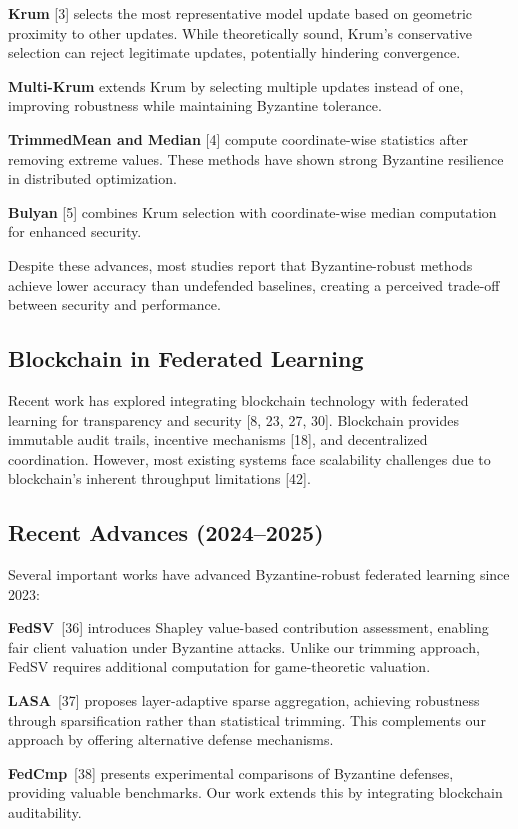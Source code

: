 \documentclass[12pt,a4paper,onecolumn]{article}
\begin{document}
\textbf{Krum} [3] selects the most representative model update based on geometric proximity to other updates. While theoretically sound, Krum's conservative selection can reject legitimate updates, potentially hindering convergence.

\textbf{Multi-Krum} extends Krum by selecting multiple updates instead of one, improving robustness while maintaining Byzantine tolerance.

\textbf{TrimmedMean and Median} [4] compute coordinate-wise statistics after removing extreme values. These methods have shown strong Byzantine resilience in distributed optimization.

\textbf{Bulyan} [5] combines Krum selection with coordinate-wise median computation for enhanced security.

Despite these advances, most studies report that Byzantine-robust methods achieve lower accuracy than undefended baselines, creating a perceived trade-off between security and performance.

\subsection{Blockchain in Federated Learning}

Recent work has explored integrating blockchain technology with federated learning for transparency and security [8, 23, 27, 30]. Blockchain provides immutable audit trails, incentive mechanisms [18], and decentralized coordination. However, most existing systems face scalability challenges due to blockchain's inherent throughput limitations [42].

\subsection{Recent Advances (2024--2025)}

Several important works have advanced Byzantine-robust federated learning since 2023:

\textbf{FedSV}~[36] introduces Shapley value-based contribution assessment, enabling fair client valuation under Byzantine attacks. Unlike our trimming approach, FedSV requires additional computation for game-theoretic valuation.

\textbf{LASA}~[37] proposes layer-adaptive sparse aggregation, achieving robustness through sparsification rather than statistical trimming. This complements our approach by offering alternative defense mechanisms.

\textbf{FedCmp}~[38] presents experimental comparisons of Byzantine defenses, providing valuable benchmarks. Our work extends this by integrating blockchain auditability.
\end{document}
